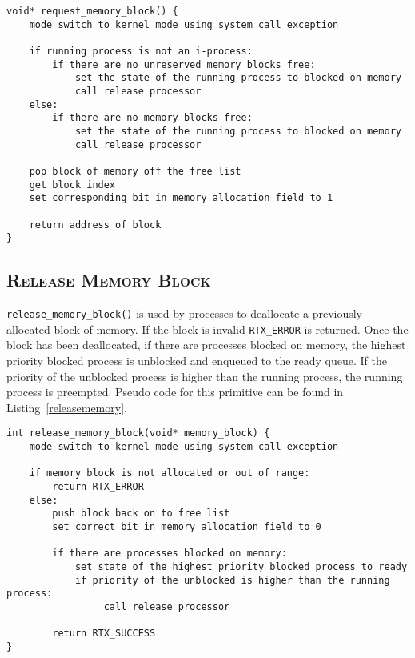 \documentclass[oneside]{report}
\begin{document}
\begin{lstlisting}
void* request_memory_block() {
    mode switch to kernel mode using system call exception

    if running process is not an i-process:
        if there are no unreserved memory blocks free:
            set the state of the running process to blocked on memory
            call release processor
    else:
        if there are no memory blocks free:
            set the state of the running process to blocked on memory
            call release processor

    pop block of memory off the free list        
    get block index
    set corresponding bit in memory allocation field to 1

    return address of block
}
\end{lstlisting}

\subsection{\textsc{Release Memory Block}}

\texttt{release\_memory\_block()} is used by processes to deallocate a
previously allocated block of memory. If the block is invalid
\texttt{RTX\_ERROR} is returned. Once the block has been deallocated,
if there are processes blocked on memory, the highest priority blocked
process is unblocked and enqueued to the ready queue. If the priority
of the unblocked process is higher than the running process, the
running process is preempted. Pseudo code for this primitive can be
found in Listing~\ref{releasememory}.

\begin{lstlisting}
int release_memory_block(void* memory_block) {
    mode switch to kernel mode using system call exception

    if memory block is not allocated or out of range:
        return RTX_ERROR
    else:
        push block back on to free list
        set correct bit in memory allocation field to 0

        if there are processes blocked on memory:
            set state of the highest priority blocked process to ready
            if priority of the unblocked is higher than the running process:
                 call release processor

        return RTX_SUCCESS        
}
\end{lstlisting}
\end{document}
